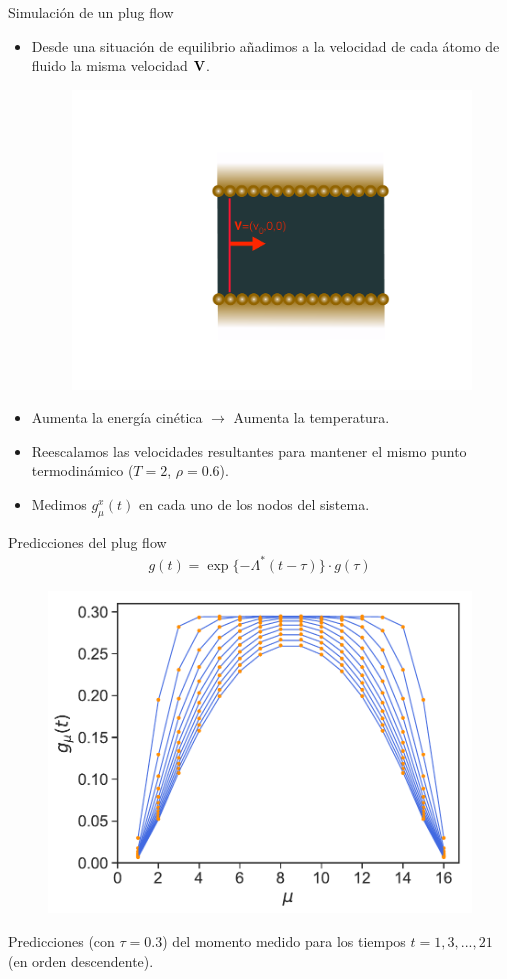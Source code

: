 \documentclass{beamer}
\newcommand{\esc}{\!\cdot\!}
\begin{document}
\begin{frame}{Simulación de un plug flow}
  \begin{itemize}
    \item<1-> Desde una situación de equilibrio añadimos a la velocidad de cada átomo de fluido la misma velocidad $\bf{V}$.
\begin{figure}[]
  \includegraphics[width=0.3\linewidth]{plug_flow}
\end{figure}
\item<2-> Aumenta la energía cinética $\rightarrow$ Aumenta la temperatura.
\item<3-> Reescalamos las velocidades resultantes para mantener el mismo punto termodinámico ($T=2$, $\rho=0.6$).
\item<4-> Medimos $g^x_{\mu}(t)$ en cada uno de los nodos del sistema. 
  \end{itemize}
\end{frame}

\begin{frame}{Predicciones del plug flow}
  \begin{align}
    g(t)=\exp\{-\Lambda^* (t-\tau)\}\esc g(\tau)
    \nonumber
\end{align}
\begin{figure}[!h]
\includegraphics[width=0.55\linewidth]{gxtPredictions-17nodes-WALLS-defense1}
\end{figure}
  {\color{orange} Predicciones} (con $\tau=0.3$) del {\color{blue} momento medido} para los tiempos $t=1,3,...,21$ (en orden descendente).
\end{frame}
\end{document}
